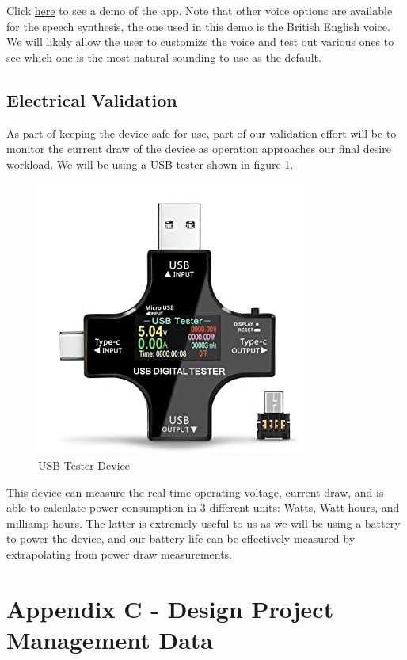 \documentclass[a4paper,11pt]{article}
\begin{document}
\noindent
Click \href{https://youtu.be/mMBuUgM9Zts}{here} to see a demo of the app. Note that other voice options are available for the speech synthesis, the one used in this demo is the British English voice. We will likely allow the user to customize the voice and test out various ones to see which one is the most natural-sounding to use as the default.

\subsection{Electrical Validation}
\label{elec-verification}
As part of keeping the device safe for use, part of our validation effort will be to monitor the current draw of the device as operation approaches our final desire workload. We will be using a USB tester shown in figure \ref{fig:usb-tester}.

\begin{figure}[H]
\centering
\includegraphics[scale=0.6]{img/USB tester.jpg}
\caption{USB Tester Device}
\label{fig:usb-tester}
\end{figure}

\noindent
This device can measure the real-time operating voltage, current draw, and is able to calculate power consumption in 3 different units: Watts, Watt-hours, and milliamp-hours. The latter is extremely useful to us as we will be using a battery to power the device, and our battery life can be effectively measured by extrapolating from power draw measurements.



\newpage
\section{Appendix C - Design Project Management Data}
\label{appendix-c}
\end{document}
